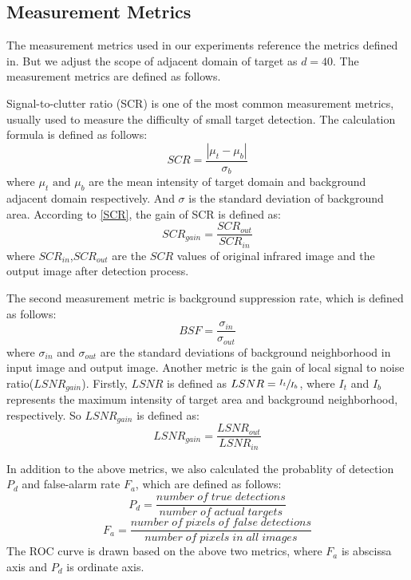 \documentclass[journal]{IEEEtran}
\begin{document}
\subsection{Measurement Metrics}
The measurement metrics used in our experiments reference the metrics defined in\cite{gao2013infrared}\cite{dai2017reweighted}. But we adjust the scope of adjacent domain of target as $d=40$. The measurement metrics are defined as follows.

Signal-to-clutter ratio (SCR) is one of the most common measurement metrics, usually used to measure the difficulty of small target detection. The calculation formula is defined as follows:
\begin{equation}
  SCR=\frac{\left| \mu_t -\mu_b \right|}{\sigma_b}
  \label{SCR}
\end{equation}
where $\mu_t \text{ and }\mu_b$ are the mean intensity of target domain and background adjacent domain respectively. And $\sigma$ is the standard deviation of background area. According to \ref{SCR}, the gain of SCR is defined as:
\begin{equation}
  SCR_{gain}=\frac{SCR_{out}}{SCR_{in}}
\end{equation}
where $SCR_{in}$,$SCR_{out}$ are the $SCR$ values of original infrared image and the output image after detection process.

The second measurement metric is background suppression rate, which is defined as follows:
\begin{equation}
  BSF=\frac{\sigma_{in}}{\sigma_{out}}
\end{equation}
where $\sigma _{in}$ and $\sigma _{out}$ are the standard deviations of background neighborhood in input image and output image. Another metric is the gain of local signal to noise ratio($LSNR_{gain}$). Firstly, $LSNR$ is defined as $LSNR=\sfrac{I_t}{I_b}$, where $I_t$ and $I_b$ represents the maximum intensity of target area and background neighborhood, respectively. So $LSNR_{gain}$ is defined as:
\begin{equation}
  LSNR_{gain}=\frac{LSNR_{out}}{LSNR_{in}}
\end{equation}

In addition to the above metrics, we also calculated the probablity of detection $P_d$ and false-alarm rate $F_a$, which are defined as follows:
\begin{equation}
  P_d=\frac{number\;of\;true\;detections}{number\;of\;actual\;targets}
\end{equation}
\begin{equation}
  F_a=\frac{number\;of\;pixels\;of\;false\;detections}{number\;of\;pixels\;in\;all\;images}
\end{equation}
The ROC curve is drawn based on the above two metrics, where $F_a$ is abscissa axis and $P_d$ is ordinate axis.
\end{document}
